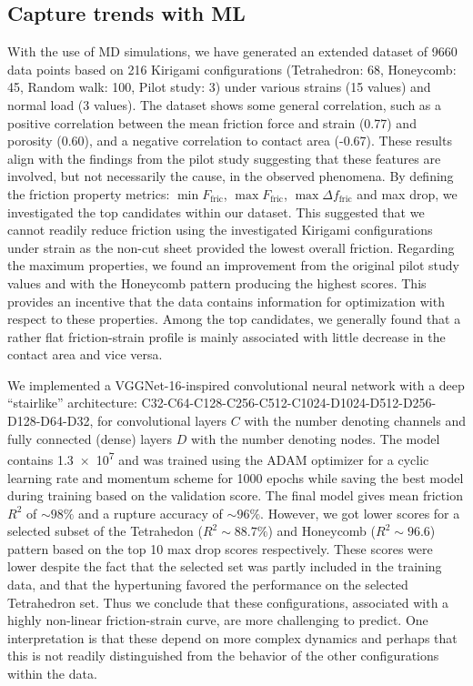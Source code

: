 \subsection{Capture trends with ML}
With the use of \acrshort{MD} simulations, we have generated an extended dataset
of 9660 data points based on 216 Kirigami configurations (Tetrahedron: 68,
Honeycomb: 45, Random walk: 100, Pilot study: 3) under various strains (15
values) and normal load (3 values). The dataset shows some general correlation,
such as a positive correlation between the mean friction force and strain (0.77)
and porosity (0.60), and a negative correlation to contact area (-0.67). These
results align with the findings from the pilot study suggesting that these
features are involved, but not necessarily the cause, in the observed phenomena.
By defining the friction property metrics: $\min F_{\text{fric}}$,  $\max
F_{\text{fric}}$, $\max \Delta f_{\text{fric}}$ and max drop, we investigated
the top candidates within our dataset. This suggested that we cannot readily
reduce friction using the investigated Kirigami configurations under strain as
the non-cut sheet provided the lowest overall friction. Regarding the maximum
properties, we found an improvement from the original pilot study values and
with the Honeycomb pattern producing the highest scores. This provides an
incentive that the data contains information for optimization with respect to
these properties. Among the top candidates, we generally found that a rather
flat friction-strain profile is mainly associated with little decrease in the
contact area and vice versa. 

We implemented a VGGNet-16-inspired convolutional neural network with a deep
``stairlike'' architecture:
C32-C64-C128-C256-C512-C1024-D1024-D512-D256-D128-D64-D32, for convolutional
layers $C$ with the number denoting channels and fully connected (dense) layers
$D$ with the number denoting nodes. The model contains \num{1.3e7} and was
trained using the ADAM optimizer for a cyclic learning rate and momentum scheme
for 1000 epochs while saving the best model during training based on the
validation score. The final model gives mean friction $R^2$ of $\sim 98\%$ and a
rupture accuracy of $\sim 96 \%$. However, we got lower scores for a selected
subset of the Tetrahedon ($R^2 \sim 88.7 \%$) and Honeycomb ($R^2 \sim 96.6$)
pattern based on the top 10 max drop scores respectively. These scores were
lower despite the fact that the selected set was partly included in the training
data, and that the hypertuning favored the performance on the selected
Tetrahedron set. Thus we conclude that these configurations, associated with a
highly non-linear friction-strain curve, are more challenging to predict. One
interpretation is that these depend on more complex dynamics and perhaps that
this is not readily distinguished from the behavior of the other configurations
within the data.



